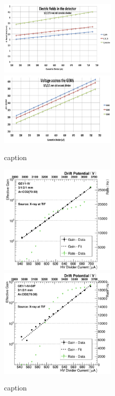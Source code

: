\begin{figure}[htbp]
    \centering
    \includegraphics[width=0.5\textwidth]{figures/GEM/GE11_IV_ElectricField_detector.jpeg}%
    \includegraphics[width=0.5\textwidth]{figures/GEM/GE11_IV_VoltageAcross_GEM.jpeg}
    \caption{caption}
    \label{fig:GEM_voltage_electricfield}
\end{figure}
\begin{figure}[htbp]
    \centering
    \includegraphics[width=0.5\textwidth]{figures/GEM/Gain_curve_GE11_IV_Ar_CO2.jpeg}%
    \includegraphics[width=0.5\textwidth]{figures/GEM/Gain_curve_GE11_IV_GIF_Ar_CO2.jpeg}
    \caption{caption}
    \label{fig:gain_GE1/1_IV}
\end{figure}

